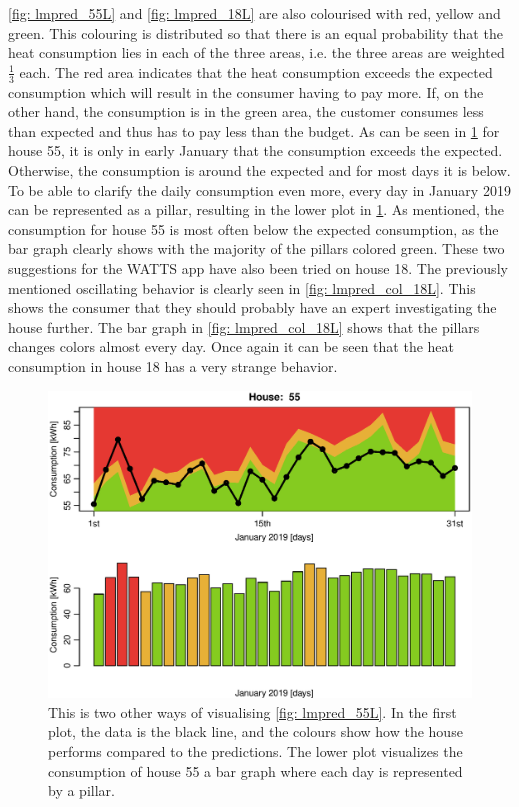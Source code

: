 \noindent \cref{fig: lmpred_55L} and \cref{fig: lmpred_18L} are also colourised with red, yellow and green. This colouring is distributed so that there is an equal probability that the heat consumption lies in each of the three areas, i.e. the three areas are weighted $\frac{1}{3}$ each. The red area indicates that the heat consumption exceeds the expected consumption which will result in the consumer having to pay more. If, on the other hand, the consumption is in the green area, the customer consumes less than expected and thus has to pay less than the budget. As can be seen in \cref{fig: lmpred_col_55L} for house 55, it is only in early January that the consumption exceeds the expected. Otherwise, the consumption is around the expected and for most days it is below. To be able to clarify the daily consumption even more, every day in January 2019 can be represented as a pillar, resulting in the lower plot in \cref{fig: lmpred_col_55L}. As mentioned, the consumption for house 55 is most often below the expected consumption, as the bar graph clearly shows with the majority of the pillars colored green. These two suggestions for the WATTS app have also been tried on house 18. The previously mentioned oscillating behavior is clearly seen in \cref{fig: lmpred_col_18L}. This shows the consumer that they should probably have an expert investigating the house further. The bar graph in \cref{fig: lmpred_col_18L} shows that the pillars changes colors almost every day. Once again it can be seen that the heat consumption in house 18 has a very strange behavior.
\begin{figure}
    \centering
    \includegraphics[width=.8\textwidth]{../../../figures/Kplot55.eps}
    \caption{This is two other ways of visualising \cref{fig: lmpred_55L}. In the first plot, the data is the black line, and the colours show how the house performs compared to the predictions. The lower plot visualizes the consumption of house 55 a bar graph where each day is represented by a pillar.}
    \label{fig: lmpred_col_55L}
\end{figure}

